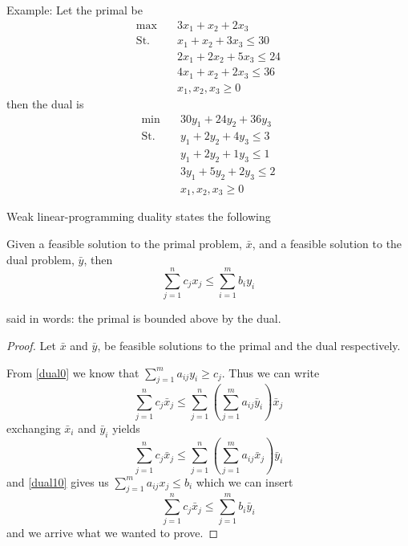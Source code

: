 \documentclass[10pt]{article}
\begin{document}
Example: Let the primal be
\begin{align}
 \max &\quad 3x_1 + x_2 + 2x_3\label{dual1}\\ 
 \text{St.} &\quad  x_1  + x_2  + 3x_3 \leq 30 \nonumber\\
            &\quad  2x_1 + 2x_2 + 5x_3 \leq 24 \nonumber\\
            &\quad  4x_1 + x_2  + 2x_3 \leq 36 \nonumber\\            
            &\quad  x_1,x_2,x_3 \geq 0  \nonumber
\end{align}
then the dual is
\begin{align}
 \min &\quad 30y_1 + 24y_2 + 36y_3 \label{dual2}\\ 
 \text{St.} &\quad  y_1 + 2y_2  + 4y_3 \leq 3 \nonumber\\
            &\quad  y_1 + 2y_2  + 1y_3 \leq 1 \nonumber\\
            &\quad  3y_1 + 5y_2  + 2y_3 \leq 2 \nonumber\\            
            &\quad  x_1,x_2,x_3 \geq 0  \nonumber
\end{align}

Weak linear-programming duality states the following
\begin{theorem}
  Given a feasible solution to the primal problem, $\bar{x}$, and a feasible solution to the dual problem, $\bar{y}$, then
  \begin{equation}
  \sum_{j=1}^n c_jx_j \leq \sum_{i=1}^m b_iy_i
  \end{equation}  
\end{theorem}
said in words: the primal is bounded above by the dual.

\begin{proof}
Let $\bar{x}$ and $\bar{y}$, be feasible solutions to the primal and the dual respectively.

From \ref{dual0} we know that $\sum_{j=1}^m a_{ij}y_i \geq c_j$. Thus we can write
\begin{equation}
\sum_{j=1}^n c_j\bar{x}_j \leq  \sum_{j=1}^n \left (\sum_{j=1}^m a_{ij}\bar{y}_i\right)\bar{x}_j   
\end{equation}
exchanging $\bar{x}_i$ and $\bar{y}_i$ yields
\begin{equation}
\sum_{j=1}^n c_j\bar{x}_j \leq  \sum_{j=1}^n \left (\sum_{j=1}^m a_{ij}\bar{x}_j\right)\bar{y}_i
\end{equation}
and \ref{dual10} gives us $\sum_{j=1}^m a_{ij}x_j \leq b_i$ which we can insert
\begin{equation}
\sum_{j=1}^n c_j\bar{x}_j \leq  \sum_{j=1}^m b_i\bar{y}_i
\end{equation}
and we arrive what we wanted to prove.
\end{proof}
\end{document}
